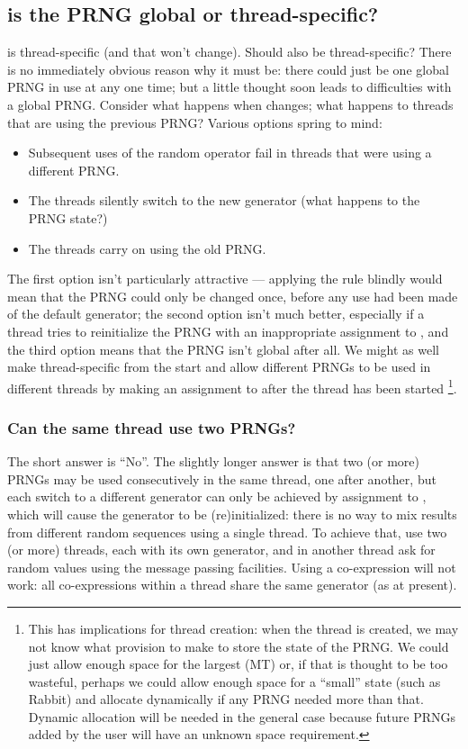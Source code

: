 \documentclass[letterpaper,12pt]{article}
\begin{document}
\subsection{is the PRNG global or thread-specific?}
\rndkwd is thread-specific (and that won't change). Should \rndlibkwd also
be thread-specific? There is no immediately obvious reason why it must be:
there could just be one global PRNG in use at any one time; but a little
thought soon leads to difficulties with a global PRNG.  Consider what
happens when \rndlibkwd changes; what happens to threads that are using the
previous PRNG? Various options spring to mind:
\begin{itemize}
\item
  Subsequent uses of the random operator fail in threads that were using a
  different PRNG.
\item
  The threads silently switch to the new generator (what happens to the
  PRNG state?)
\item
  The threads carry on using the old PRNG.
\end{itemize}
The first option isn't particularly attractive --- applying the rule
blindly would mean that the PRNG could only be changed once, before any use
had been made of the default generator; the second option isn't much
better, especially if a thread tries to reinitialize the PRNG with an
inappropriate assignment to \rndkwd, and the third option means that the
PRNG isn't global after all. We might as well make \rndlibkwd
thread-specific from the start and allow different PRNGs to be used in
different threads by making an assignment to \rndlibkwd after the thread
has been started%
\footnote{
  This has implications for thread creation: when the thread is created, we
  may not know what provision to make to store the state of the PRNG. We
  could just allow enough space for the largest (MT) or, if that is thought
  to be too wasteful, perhaps we could allow enough space for a ``small''
  state (such as Rabbit) and allocate dynamically if any PRNG needed more than
  that. Dynamic allocation will be needed in the general case because
  future PRNGs added by the user will have an unknown space requirement.
}.
\subsubsection{Can the same thread use two PRNGs?}
The short answer is ``No''. The slightly longer answer is that two (or
more) PRNGs may be used consecutively in the same thread, one after
another, but each switch to a different generator can only be achieved by
assignment to \rndlibkwd, which will cause the generator to be
(re)initialized: there is no way to mix results from different random
sequences using a single thread. To achieve that, use two (or more)
threads, each with its own generator, and in another thread ask for random
values using the message passing facilities. Using a co-expression will not
work: all co-expressions within a thread share the same generator (as at
present).
\end{document}
